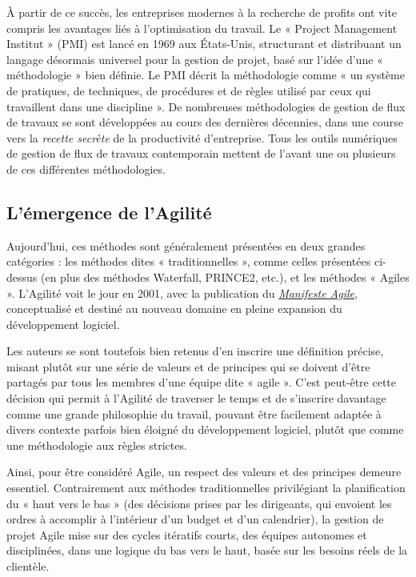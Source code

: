 \documentclass[
  letterpaper,
  DIV=11,
  numbers=noendperiod,
  oneside]{scrreprt}
\begin{document}
À partir de ce succès, les entreprises modernes à la recherche de
profits ont vite compris les avantages liés à l'optimisation du travail.
Le « Project Management Institut » (PMI) est lancé en 1969 aux
États-Unis, structurant et distribuant un langage désormais universel
pour la gestion de projet, basé sur l'idée d'une « méthodologie » bien
définie. Le PMI décrit la méthodologie comme « un système de pratiques,
de techniques, de procédures et de règles utilisé par ceux qui
travaillent dans une discipline ». De nombreuses méthodologies de
gestion de flux de travaux se sont développées au cours des dernières
décennies, dans une course vers la \emph{recette secrète} de la
productivité d'entreprise. Tous les outils numériques de gestion de flux
de travaux contemporain mettent de l'avant une ou plusieurs de ces
différentes méthodologies.

\hypertarget{luxe9mergence-de-lagilituxe9}{%
\subsection{L'émergence de
l'Agilité}\label{luxe9mergence-de-lagilituxe9}}

Aujourd'hui, ces méthodes sont généralement présentées en deux grandes
catégories : les méthodes dites « traditionnelles », comme celles
présentées ci-dessus (en plus des méthodes Waterfall, PRINCE2, etc.), et
les méthodes « Agiles ». L'Agilité voit le jour en 2001, avec la
publication du
\href{https://agilemanifesto.org/iso/fr/manifesto.html}{\emph{Manifeste
Agile}}, conceptualisé et destiné au nouveau domaine en pleine expansion
du développement logiciel.

Les auteurs se sont toutefois bien retenus d'en inscrire une définition
précise, misant plutôt sur une série de valeurs et de principes qui se
doivent d'être partagés par tous les membres d'une équipe dite « agile
». C'est peut-être cette décision qui permit à l'Agilité de traverser le
temps et de s'inscrire davantage comme une grande philosophie du
travail, pouvant être facilement adaptée à divers contexte parfois bien
éloigné du développement logiciel, plutôt que comme une méthodologie aux
règles strictes.

Ainsi, pour être considéré Agile, un respect des valeurs et des
principes demeure essentiel. Contrairement aux méthodes traditionnelles
privilégiant la planification du « haut vers le bas » (des décisions
prises par les dirigeants, qui envoient les ordres à accomplir à
l'intérieur d'un budget et d'un calendrier), la gestion de projet Agile
mise sur des cycles itératifs courts, des équipes autonomes et
disciplinées, dans une logique du bas vers le haut, basée sur les
besoins réels de la clientèle.
\end{document}
